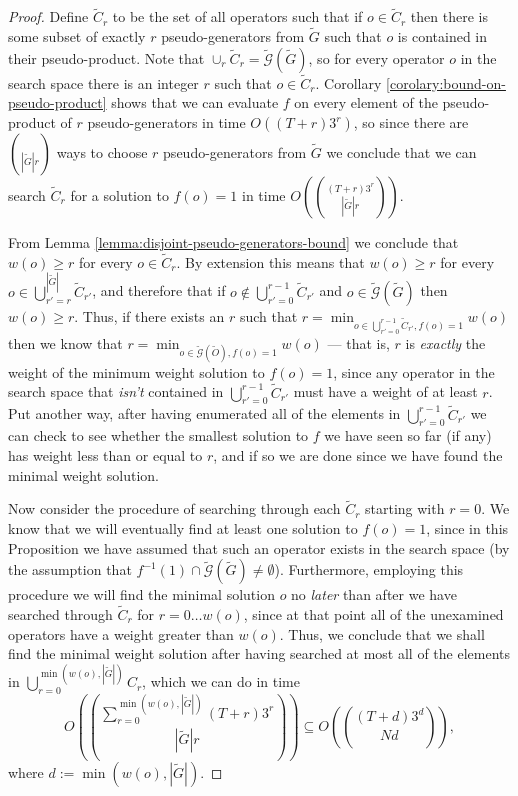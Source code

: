 \documentclass{amsbook}
\theoremstyle{plain}
\theoremstyle{definition}
\theoremstyle{remark}
\newcommand{\set}{\tilde}
\newcommand{\genfun}{\tilde{\mathcal{G}}}
\newcommand{\paren}[1]{\left(#1\right)}
\begin{document}
\begin{proof}
Define $\set C_r$ to be the set of all operators such that if $o\in\set C_r$ then there is some subset of exactly $r$ pseudo-generators from $\set G$ such that $o$ is contained in their pseudo-product.  Note that $\cup_r \set C_r = \genfun(\set G)$, so for every operator $o$ in the search space there is an integer $r$ such that $o\in\set C_r$.  Corollary \ref{corolary:bound-on-pseudo-product} shows that we can evaluate $f$ on every element of the pseudo-product of $r$ pseudo-generators in time $O((T+r)3^r)$, so since there are $\choose{|\set G|}{r}$ ways to choose $r$ pseudo-generators from $\set G$ we conclude that we can search $\set C_r$ for a solution to $f(o)=1$ in time $O\paren{(T+r) 3^r \choose{|\set G|}{r}}$.

From Lemma \ref{lemma:disjoint-pseudo-generators-bound} we conclude that $w(o)\ge r$ for every $o\in\set C_r$.  By extension this means that $w(o)\ge r$ for every $o\in\bigcup_{r'=r}^{|\set G|}\set C_{r'}$, and therefore that if $o\notin\bigcup_{r'=0}^{r-1}\set C_{r'}$ and $o\in\genfun(\set G)$ then $w(o)\ge r$.  Thus, if there exists an $r$ such that $r=\min_{o\in\bigcup_{r'=0}^{r-1}\set C_{r'},f(o)=1}w(o)$ then we know that $r=\min_{o\in\genfun(\set O),f(o)=1}w(o)$ --- that is, $r$ is \emph{exactly} the weight of the minimum weight solution to $f(o)=1$, since any operator in the search space that \emph{isn't} contained in $\bigcup_{r'=0}^{r-1}\set C_{r'}$ must have a weight of at least $r$.  Put another way, after having enumerated all of the elements in $\bigcup_{r'=0}^{r-1}\set C_{r'}$ we can check to see whether the smallest solution to $f$ we have seen so far (if any) has weight less than or equal to $r$, and if so we are done since we have found the minimal weight solution.

Now consider the procedure of searching through each $\set C_r$ starting with $r=0$.  We know that we will eventually find at least one solution to $f(o)=1$, since in this Proposition we have assumed that such an operator exists in the search space (by the assumption that $f^{-1}(1)\cap\genfun(\set G)\ne\emptyset$).  Furthermore, employing this procedure we will find the minimal solution $o$ no \emph{later} than after we have searched through $\set C_r$ for $r=0\dots w(o)$, since at that point all of the unexamined operators have a weight greater than $w(o)$.  Thus, we conclude that we shall find the minimal weight solution after having searched at most all of the elements in $\bigcup_{r=0}^{\min(w(o),|\set G|)} C_r$, which we can do in time $$O\paren{\sum_{r=0}^{\min(w(o),|\set G|)}(T+r) 3^r \choose{|\set G|}{r}}\subseteq O\paren{(T+d) 3^d \choose{N}{d}},$$ where $d:=\min(w(o),|\set G|)$.
\end{proof}
\end{document}
